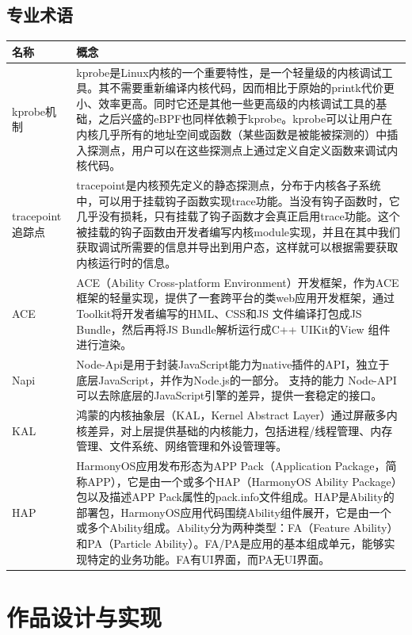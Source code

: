 \documentclass[12pt,a4paper]{ctexart}
\begin{document}
\subsection{专业术语}
\newpage
  \begin{longtable}{|l|p{10cm}|}
    \hline
    名称&概念\\
    \hline
    kprobe机制&kprobe是Linux内核的一个重要特性，是一个轻量级的内核调试工具。其不需要重新编译内核代码，因而相比于原始的printk代价更小、效率更高。同时它还是其他一些更高级的内核调试工具的基础，之后兴盛的eBPF也同样依赖于kprobe。kprobe可以让用户在内核几乎所有的地址空间或函数（某些函数是被能被探测的）中插入探测点，用户可以在这些探测点上通过定义自定义函数来调试内核代码。\\
    \hline
tracepoint追踪点 & tracepoint是内核预先定义的静态探测点，分布于内核各子系统中，可以用于挂载钩子函数实现trace功能。当没有钩子函数时，它几乎没有损耗，只有挂载了钩子函数才会真正启用trace功能。这个被挂载的钩子函数由开发者编写内核module实现，并且在其中我们获取调试所需要的信息并导出到用户态，这样就可以根据需要获取内核运行时的信息。 \\
\hline
ACE              & ACE（Ability Cross-platform Environment）开发框架，作为ACE框架的轻量实现，提供了一套跨平台的类web应用开发框架，通过Toolkit将开发者编写的HML、CSS和JS 文件编译打包成JS Bundle，然后再将JS Bundle解析运行成C++ UIKit的View 组件进行渲染。 \\
\hline
Napi             & Node-Api是用于封装JavaScript能力为native插件的API，独立于底层JavaScript，并作为Node.js的一部分。 支持的能力 Node-API可以去除底层的JavaScript引擎的差异，提供一套稳定的接口。 \\
\hline
KAL              & 鸿蒙的内核抽象层（KAL，Kernel Abstract Layer）通过屏蔽多内核差异，对上层提供基础的内核能力，包括进程/线程管理、内存管理、文件系统、网络管理和外设管理等。 \\
\hline
HAP              & HarmonyOS应用发布形态为APP Pack（Application Package，简称APP），它是由一个或多个HAP（HarmonyOS Ability Package）包以及描述APP Pack属性的pack.info文件组成。HAP是Ability的部署包，HarmonyOS应用代码围绕Ability组件展开，它是由一个或多个Ability组成。Ability分为两种类型：FA（Feature Ability）和PA（Particle Ability）。FA/PA是应用的基本组成单元，能够实现特定的业务功能。FA有UI界面，而PA无UI界面。 \\
\hline

\end{longtable}


\newpage
\section{作品设计与实现}
\end{document}
